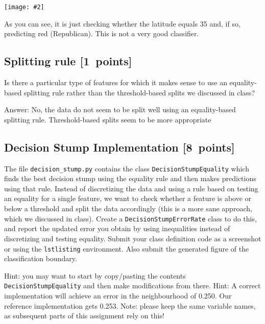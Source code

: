 \documentclass{article}
\newcommand{\blu}[1]{{\textcolor{blu}{#1}}}
\newcommand{\gre}[1]{\textcolor{gre}{#1}}
\newcommand\ans[1]{\par\gre{Answer: #1}}
\let\ask\blu
\newcommand\pts[1]{\textcolor{pointscolour}{[#1~points]}}
\newcommand{\centerfig}[2]{\begin{center}\texttt{[image: \#2]}\end{center}}
\begin{document}
  \centerfig{0.7}{./figs/q6_decisionBoundary}

  As you can see, it is just checking whether the latitude equals 35 and, if so, predicting red (Republican).
  This is not a very good classifier.

  \subsection{Splitting rule \pts{1}}

  Is there a particular type of features for which it makes sense to use an equality-based splitting rule rather than the threshold-based splits we discussed in class?

  \ans{No, the data do not seem to be split well using an equality-based splitting rule. Threshold-based splits seem to be more appropriate}


  \subsection{Decision Stump Implementation \pts{8}}

  The file \texttt{decision\string_stump.py} contains the class \texttt{DecisionStumpEquality} which
  finds the best decision stump using the equality rule and then makes predictions using that
  rule. Instead of discretizing the data and using a rule based on testing an equality for
  a single feature, we want to check whether a feature is above or below a threshold and
  split the data accordingly (this is a more sane approach, which we discussed in class).
  \ask{Create a \texttt{DecisionStumpErrorRate} class to do this, and report the updated error you
  obtain by using inequalities instead of discretizing and testing equality. 
  Submit your class definition code as a screenshot or using the \texttt{lstlisting} environment.
  Also submit the generated figure of the classification boundary.}

  Hint: you may want to start by copy/pasting the contents \texttt{DecisionStumpEquality} and then make modifications from there. 
  Hint: A correct implementation will achieve an error in the neighbourhood of 0.250. Our reference implementation gets 0.253. 
  Note: please keep the same variable names, as subsequent parts of this assignment rely on this!
\end{document}

